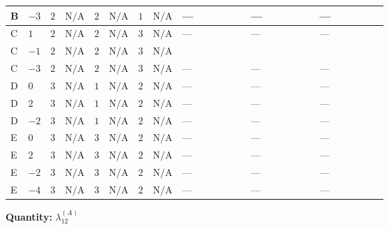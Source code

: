 \documentclass[8pt]{article}
\begin{document}
\begin{landscape}
\begin{longtable}{@{}llcccccc >{\raggedright\arraybackslash}p{0.21\linewidth} >{\raggedright\arraybackslash}p{0.21\linewidth} >{\raggedright\arraybackslash}p{0.21\linewidth}@{}}
\midrule
B & $-3$ & $2$ & $\text{N/A}$ & $2$ & $\text{N/A}$ & $1$ & $\text{N/A}$ & --- & --- & --- \\
\midrule
C & $1$ & $2$ & $\text{N/A}$ & $2$ & $\text{N/A}$ & $3$ & $\text{N/A}$ & --- & --- & --- \\
\midrule
C & $-1$ & $2$ & $\text{N/A}$ & $2$ & $\text{N/A}$ & $3$ & $\text{N/A}$ & \scriptsize\adjustbox{max width=\linewidth}{$\begin{gathered} -64 {\lambda_{9}} \left({\lambda_{9}}\right)^{*}\end{gathered}$} & \scriptsize\adjustbox{max width=\linewidth}{$\begin{gathered} -4 {\lambda_{10}} (5 \left({\lambda_{10}}\right)^{*}+\left({\lambda_{11}}\right)^{*})\end{gathered}$} & \scriptsize\adjustbox{max width=\linewidth}{$\begin{gathered} -4 {\lambda_{11}} (\left({\lambda_{10}}\right)^{*}+5 \left({\lambda_{11}}\right)^{*})\end{gathered}$} \\
\midrule
C & $-3$ & $2$ & $\text{N/A}$ & $2$ & $\text{N/A}$ & $3$ & $\text{N/A}$ & --- & --- & --- \\
\midrule
D & $0$ & $3$ & $\text{N/A}$ & $1$ & $\text{N/A}$ & $2$ & $\text{N/A}$ & --- & --- & --- \\
\midrule
D & $2$ & $3$ & $\text{N/A}$ & $1$ & $\text{N/A}$ & $2$ & $\text{N/A}$ & --- & --- & --- \\
\midrule
D & $-2$ & $3$ & $\text{N/A}$ & $1$ & $\text{N/A}$ & $2$ & $\text{N/A}$ & --- & --- & --- \\
\midrule
E & $0$ & $3$ & $\text{N/A}$ & $3$ & $\text{N/A}$ & $2$ & $\text{N/A}$ & --- & --- & --- \\
\midrule
E & $2$ & $3$ & $\text{N/A}$ & $3$ & $\text{N/A}$ & $2$ & $\text{N/A}$ & --- & --- & --- \\
\midrule
E & $-2$ & $3$ & $\text{N/A}$ & $3$ & $\text{N/A}$ & $2$ & $\text{N/A}$ & --- & --- & --- \\
\midrule
E & $-4$ & $3$ & $\text{N/A}$ & $3$ & $\text{N/A}$ & $2$ & $\text{N/A}$ & --- & --- & --- \\
\midrule
\bottomrule
\end{longtable}
\clearpage
\noindent\textbf{Quantity: }$\lambda_{12}^{(A)}$\par\smallskip

\end{landscape}
\end{document}
